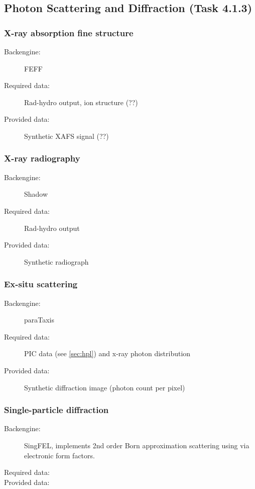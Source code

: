 \documentclass[12pt]{scrartcl}
\begin{document}
\subsection{Photon Scattering and Diffraction (Task 4.1.3)}

\subsubsection{X-ray absorption fine structure}
\begin{description}
  \item[Backengine:] FEFF
  \item[Required data:] Rad-hydro output, ion structure (??)
  \item[Provided data:] Synthetic XAFS signal (??)
\end{description}

\subsubsection{X-ray radiography}
\begin{description}
  \item[Backengine:] Shadow \cite{}
  \item[Required data:] Rad-hydro output
  \item[Provided data:] Synthetic radiograph
\end{description}
\subsubsection{Ex-situ scattering}
\begin{description}
  \item[Backengine:] paraTaxis \cite{paraTaxis_github}
  \item[Required data:] PIC data (see \ref{sec:hpl}) and x-ray photon distribution
  \item[Provided data:] Synthetic diffraction image (photon count per pixel)
\end{description}

\subsubsection{Single-particle diffraction}
\begin{description}
  \item[Backengine:] SingFEL, implements 2nd order Born approximation scattering using via electronic form factors.
  \item[Required data:]
  \item[Provided data:]
\end{description}
%
\end{document}
